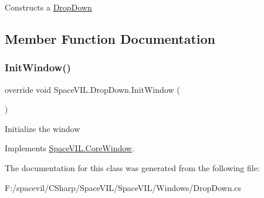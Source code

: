 Constructs a \mbox{\hyperlink{class_space_v_i_l_1_1_drop_down}{Drop\+Down}} 



\subsection{Member Function Documentation}
\mbox{\label{class_space_v_i_l_1_1_drop_down_a291f706e5ec6558798d20fa428b2ba91}} 
\subsubsection{\texorpdfstring{Init\+Window()}{InitWindow()}}
{\footnotesize\ttfamily override void Space\+V\+I\+L.\+Drop\+Down.\+Init\+Window (\begin{DoxyParamCaption}{ }\end{DoxyParamCaption})\hspace{0.3cm}{\ttfamily [virtual]}}



Initialize the window 



Implements \mbox{\hyperlink{class_space_v_i_l_1_1_core_window_aa3cf4ac54d9651b1149584dc81042824}{Space\+V\+I\+L.\+Core\+Window}}.



The documentation for this class was generated from the following file\+:\begin{DoxyCompactItemize}
\item 
F\+:/spacevil/\+C\+Sharp/\+Space\+V\+I\+L/\+Space\+V\+I\+L/\+Windows/Drop\+Down.\+cs\end{DoxyCompactItemize}

